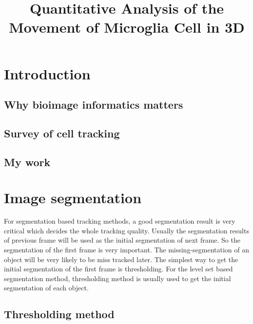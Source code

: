 \documentclass[b5,12pt]{report}
\title{Quantitative Analysis of the Movement of Microglia Cell in 3D}
\begin{document}
\maketitle
\abstract
\tableofcontents
\chapter{Introduction}
\section{Why bioimage informatics matters}
\section{Survey of cell tracking}
\section{My work}
\chapter{Image segmentation}
For segmentation based tracking methods, a good segmentation result is very critical which decides the whole tracking quality. Usually the segmentation results of previous frame will be used as the initial segmentation of next frame. So the segmentation of the first frame is very important. The missing-segmentation of an object will be very likely to be miss tracked later. The simplest way to get the initial segmentation of the first frame is thresholding. For the level set based segmentation method, thresholding method is usually used to get the initial segmentation of each object.
\section{Thresholding method}
\end{document}
